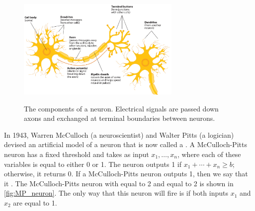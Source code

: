 \begin{figure}[h]
\centering
\mySfFamily
\includegraphics[width = 0.7\textwidth]{../images/components_of_neuron.png}\\[4ex]
\caption{The components of a neuron. Electrical signals are passed down axons and exchanged at terminal boundaries between neurons.}
\label{fig:components_of_neuron}
\end{figure}

In 1943, Warren McCulloch (a neuroscientist) and Walter Pitts (a logician) devised an artificial model of a neuron that is now called a . A McCulloch-Pitts neuron has a fixed threshold  and takes as input   $x_1, \ldots, x_n$, where each of these variables is equal to either 0 or 1. The neuron outputs 1 if $x_1 + \cdots + x_n \geq b$; otherwise, it returns 0. If a McCulloch-Pitts neuron outputs 1, then we say that it . The McCulloch-Pitts neuron with  equal to 2 and  equal to 2 is shown in \autoref{fig:MP_neuron}. The only way that this neuron will fire is if both inputs $x_1$ and $x_2$ are equal to 1.\\

\begin{note}\end{note}

